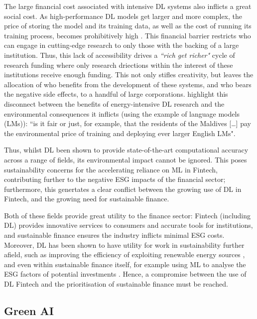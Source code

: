 \documentclass[a4paper, 11pt]{report}
\begin{document}
   The large financial cost associated with intensive DL systems also inflicts a great social cost. As high-performance DL models get larger and more complex, the price of storing the model and its training data, as well as the cost of running its training process, becomes prohibitively high \citep{schwartz-2019}. This financial barrier restricts who can engage in cutting-edge research to only those with the backing of a large institution. Thus, this lack of accessibility drives a \emph{``rich get richer"} cycle of research funding \citep{strubell-2019} where only research driections within the interest of these institutions receive enough funding. This not only stifles creativity, but leaves the allocation of who benefits from the development of these systems, and who bears the negative side effects, to a handful of large corporations. \citet{bender-2021} highlight this disconnect between the benefits of energy-intensive DL research and the environmental consequences it inflicts (using the example of language models (LMs)): ``is it fair or just, for example, that the residents of the Maldives [\ldots] pay the environmental price of training and deploying ever larger English LMs".

    Thus, whilst DL been shown to provide state-of-the-art computational accuracy across a range of fields, its environmental impact cannot be ignored. This poses sustainability concerns for the accelerating reliance on ML in Fintech, contributing further to the negative ESG impacts of the financial sector; furthermore, this genertates a clear conflict between the growing use of DL in Fintech, and the growing need for sustainable finance.
    
    Both of these fields provide great utility to the finance sector: Fintech (including DL) provides innovative services to consumers and accurate tools for institutions, and sustainable finance ensures the industry inflicts minimal ESG costs. Moreover, DL has been shown to have utility for work in sustainability further afield, such as improving the efficiency of exploiting renewable energy sources \citep{daniel-2021}, and even within sustainable finance itself, for example using ML to analyse the ESG factors of potential investments \citep{mehra-2022}. Hence, a compromise between the use of DL Fintech and the prioritisation of sustainable finance must be reached. 


    \subsection{Green AI}
\end{document}
